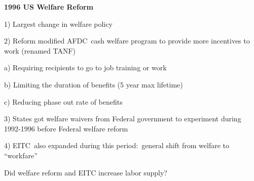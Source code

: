 \documentclass[landscape]{slides}
\begin{document}
%
%
%
%




\begin{slide}%
\begin{center}
{\bf 1996 US Welfare Reform}
\end{center}
1) Largest change in welfare policy

2) Reform modified AFDC\ cash welfare program to provide more
incentives to work (renamed TANF)

a) Requiring recipients to go to job training or work

b) Limiting the duration of benefits (5 year max lifetime)

c) Reducing phase out rate of benefits

3) States got welfare waivers from Federal government to experiment
during 1992-1996 before Federal welfare reform

4) EITC\ also expanded during this period:\ general shift from
welfare to \textquotedblleft workfare\textquotedblright


Did welfare reform and EITC increase labor supply?

\end{slide}

\begin{slide}

\end{slide}

\begin{slide}

\end{slide}




%
\end{document}
